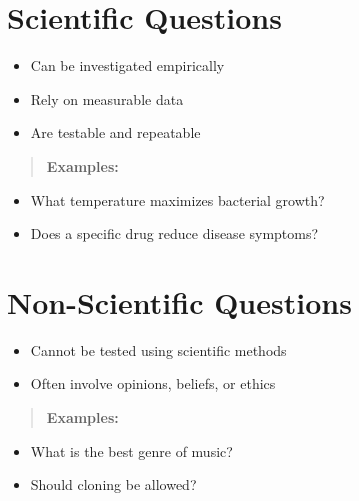 \documentclass[
  letterpaper,
  DIV=11,
  numbers=noendperiod]{scrreprt}
\begin{document}
\section*{\texorpdfstring{\textbf{Scientific
Questions}}{Scientific Questions}}\label{scientific-questions}


\begin{itemize}
\item
  Can be investigated empirically
\item
  Rely on measurable data
\item
  Are testable and repeatable
\end{itemize}

\begin{quote}
\textbf{Examples:}
\end{quote}

\begin{itemize}
\item
  What temperature maximizes bacterial growth?
\item
  Does a specific drug reduce disease symptoms?
\end{itemize}

\section*{\texorpdfstring{\textbf{Non-Scientific
Questions}}{Non-Scientific Questions}}\label{non-scientific-questions}


\begin{itemize}
\item
  Cannot be tested using scientific methods
\item
  Often involve opinions, beliefs, or ethics
\end{itemize}

\begin{quote}
\textbf{Examples:}
\end{quote}

\begin{itemize}
\item
  What is the best genre of music?
\item
  Should cloning be allowed?
\end{itemize}
\end{document}
